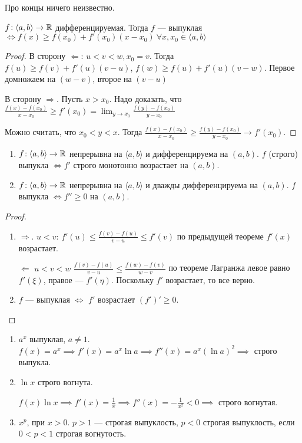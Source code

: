 \begin{remark}
    Про концы ничего неизвестно.
\end{remark}
\begin{theorem}
    $f\!: \langle a, b \rangle \to \mathbb{R}$ дифференцируемая. Тогда  $f$ --- выпуклая  $\iff f(x) \ge f(x_0) + f'(x_0)(x - x_0)\ \forall x, x_0 \in \langle a, b \rangle$
\end{theorem}
\begin{proof}
    В сторону $\Leftarrow$:  $u < v < w, x_0=v$. Тогда  $f(u) \ge f(v) + f'(u)(v-u)$, $f(w) \ge f(u) + f'(u)(v-w)$. Первое домножаем на $(w-v)$, второе на  $(v - u)$

    В сторону  $\Rightarrow$. Пусть  $x > x_0$. Надо доказать, что $\frac{f(x) - f(x_0)}{x - x_0} \ge f'(x_0) = \lim_{y \to x_0} \frac{f(y)-f(x_0)}{y-x_0}$ 

    Можно считать, что $x_0 < y < x$. Тогда  $\frac{f(x) - f(x_0)}{x - x_0} \ge \frac{f(y) - f(x_0)}{y - x_0} \to f'(x_0)$.
\end{proof}
\begin{theorem}
    \begin{enumerate}
        \item $f\!:\langle a, b \rangle \to \mathbb{R}$ непрерывна на  $\langle a, b \rangle$ и дифференцируема на  $(a, b)$.  $f$ (строго) выпукла $\iff f'$ строго монотонно возрастает на $(a, b)$.
        \item $f\!:\langle a, b \rangle \to \mathbb{R}$ непрерывна на  $\langle a, b \rangle$ и дважды дифференцируема на  $(a, b)$.  $f$ выпукла $\iff f'' \ge 0$ на $(a, b)$.
    \end{enumerate}
\end{theorem}
\begin{proof}
    \begin{enumerate}
        \item $\Rightarrow$.  $u < v$:  $f'(u) \le \frac{f(v) - f(u)}{v - u} \le f'(v)$ по предыдущей теореме $f'(x)$ возрастает.

            $\Leftarrow$  $u < v < w$  $\frac{f(v) - f(u)}{v-u} \le \frac{f(w) - f(v)}{w-v}$ по теореме Лагранжа левое равно $f'(\xi)$, правое ---  $f'(\eta)$. Поскольку  $f'$ возрастает, то все верно.

        \item  $f$ --- выпуклая  $\iff$  $f'$ возрастает  $(f')' \ge 0$.
    \end{enumerate}
\end{proof}
\begin{example}
     \begin{enumerate}
         \item $a^x$ выпуклая,  $a \neq 1$.  $f(x) = a^x \implies f'(x) = a^x\ln a \implies f''(x) = a^x(\ln a)^2 \implies$ строго выпукла.
         \item  $\ln x$ строго вогнута.

             $f(x) \ln x \implies f'(x) = \frac{1}{x} \implies f''(x) = -\frac{1}{x^2} < 0 \implies$ строго вогнутая.
         \item $x^p$, при  $x > 0$.  $p > 1$ --- строгая выпуклость,  $p < 0$ строгая выпуклость, если $0 < p < 1$ строгая вогнутость.
    \end{enumerate}
\end{example}
